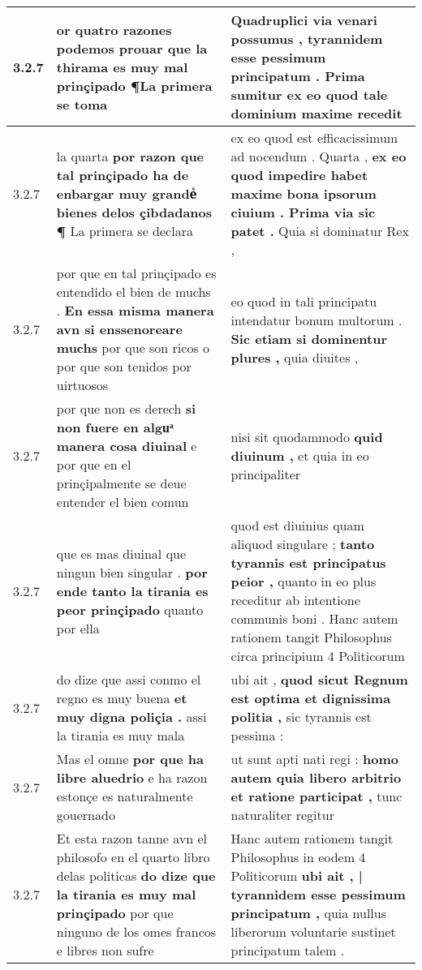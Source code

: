 \begin{tabular}{|p{1cm}|p{6.5cm}|p{6.5cm}|}
3.2.7 & or quatro razones podemos prouar \textbf{ que la thirama es muy mal prinçipado } ¶La primera se toma & Quadruplici via venari possumus , \textbf{ tyrannidem esse pessimum principatum . } Prima sumitur ex eo quod tale dominium maxime recedit \\\hline
3.2.7 & la quarta \textbf{ por razon que tal prinçipado ha de enbargar muy grandeᷤ bienes delos çibdadanos ¶ } La primera se declara & ex eo quod est efficacissimum ad nocendum . Quarta , \textbf{ ex eo quod impedire habet maxime bona ipsorum ciuium . Prima via sic patet . } Quia si dominatur Rex , \\\hline
3.2.7 & por que en tal prinçipado es entendido el bien de muchs . \textbf{ En essa misma manera avn si enssenoreare muchs } por que son ricos o por que son tenidos por uirtuosos & eo quod in tali principatu intendatur bonum multorum . \textbf{ Sic etiam si dominentur plures , } quia diuites , \\\hline
3.2.7 & por que non es derech \textbf{ si non fuere en alguͣ manera cosa diuinal } e por que en el prinçipalmente se deue entender el bien comun & nisi sit quodammodo \textbf{ quid diuinum , } et quia in eo principaliter \\\hline
3.2.7 & que es mas diuinal que ningun bien singular . \textbf{ por ende tanto la tirania es peor prinçipado } quanto por ella & quod est diuinius quam aliquod singulare ; \textbf{ tanto tyrannis est principatus peior , } quanto in eo plus receditur ab intentione communis boni . Hanc autem rationem tangit Philosophus circa principium 4 Politicorum \\\hline
3.2.7 & do dize que assi conmo el regno es muy buena \textbf{ et muy digna poliçia . } assi la tirania es muy mala & ubi ait , \textbf{ quod sicut Regnum est optima et dignissima politia , } sic tyrannis est pessima : \\\hline
3.2.7 & Mas el omne \textbf{ por que ha libre aluedrio } e ha razon estonçe es naturalmente gouernado & ut sunt apti nati regi : \textbf{ homo autem quia libero arbitrio et ratione participat , } tunc naturaliter regitur \\\hline
3.2.7 & Et esta razon tanne avn el philosofo en el quarto libro delas politicas \textbf{ do dize que la tirania es muy mal prinçipado } por que ninguno de los omes francos e libres non sufre & Hanc autem rationem tangit Philosophus in eodem 4 Politicorum \textbf{ ubi ait , | tyrannidem esse pessimum principatum , } quia nullus liberorum voluntarie sustinet principatum talem . \\\hline

\end{tabular}
